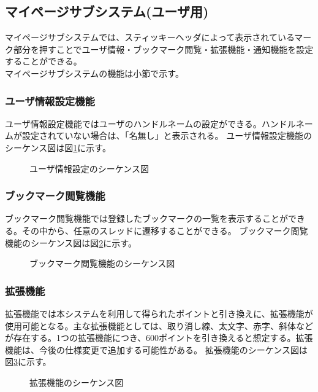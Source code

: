 \documentclass[a4j]{jarticle}
\begin{document}
  \subsection{マイページサブシステム(ユーザ用)}
  マイページサブシステムでは、スティッキーヘッダによって表示されているマーク部分を押すことでユーザ情報・ブックマーク閲覧・拡張機能・通知機能を設定することができる。\\
  マイページサブシステムの機能は小節で示す。
  \subsubsection{ユーザ情報設定機能}
  ユーザ情報設定機能ではユーザのハンドルネームの設定ができる。ハンドルネームが設定されていない場合は、「名無し」と表示される。
  ユーザ情報設定機能のシーケンス図は図\ref{fig:mypage_user.png}に示す。
  \begin{figure}[H]
    \centering
    \caption{ユーザ情報設定のシーケンス図}
    \label{fig:mypage_user.png}
  \end{figure}


  \subsubsection{ブックマーク閲覧機能}
  ブックマーク閲覧機能では登録したブックマークの一覧を表示することができる。その中から、任意のスレッドに遷移することができる。
  ブックマーク閲覧機能のシーケンス図は図\ref{fig:mypage_bookmark.png}に示す。

  \begin{figure}[H]
    \centering
    \caption{ブックマーク閲覧機能のシーケンス図}
    \label{fig:mypage_bookmark.png}
  \end{figure}


  \subsubsection{拡張機能}
  拡張機能では本システムを利用して得られたポイントと引き換えに、拡張機能が使用可能となる。主な拡張機能としては、取り消し線、太文字、赤字、斜体などが存在する。1つの拡張機能につき、600ポイントを引き換えると想定する。拡張機能は、今後の仕様変更で追加する可能性がある。
  拡張機能のシーケンス図は図\ref{fig:mypage_extension.png}に示す。

  \begin{figure}[H]
    \centering
    \caption{拡張機能のシーケンス図}
    \label{fig:mypage_extension.png}
  \end{figure}
\end{document}
